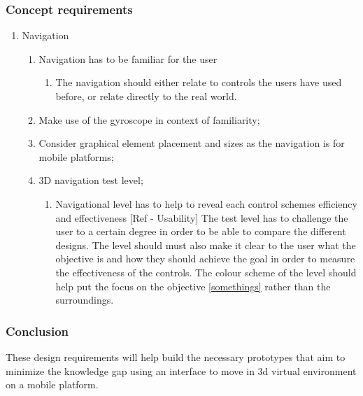 \subsubsection{Concept requirements}
\begin{enumerate}
	\item Navigation
		\begin{enumerate}
		 	\item Navigation has to be familiar for the user
		 		\begin{enumerate}
		 			\item The navigation should either relate to controls 					the users have used before, or relate directly to the 					real world.
		 		\end{enumerate}
		 	\item Make use of the gyroscope in context of familiarity;
		 	\item Consider graphical element placement and sizes as the 				navigation is for mobile platforms;
		 	\item 3D navigation test level;
		 		\begin{enumerate}
		 		\item Navigational level has to help to reveal each 						control schemes efficiency and effectiveness [Ref - 						Usability]
				The test level has to challenge the user to a certain 						degree in order to be able to compare the different 						designs. The level should must also make it clear to the 					user what the objective is and how they should achieve 						the goal in order to measure the effectiveness of the 						controls. The colour scheme of the level should help put 					the focus on the objective \ref {somethings} rather than 					the surroundings.
				\end{enumerate}
		\end{enumerate}
\end{enumerate}
		
				





\subsubsection{Conclusion}
These design requirements will help build the necessary prototypes that aim to minimize the knowledge gap using an interface to move in 3d virtual environment on a mobile platform.

